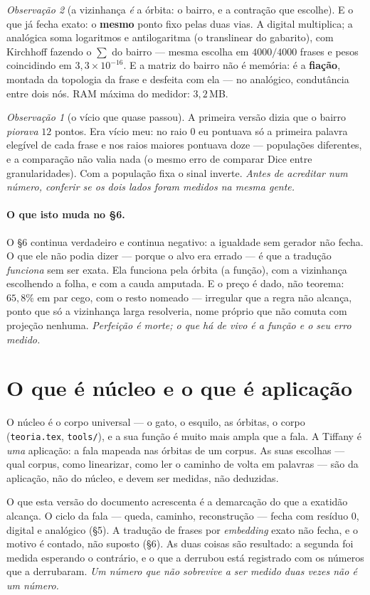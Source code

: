 \documentclass[11pt,a4paper]{article}
\theoremstyle{remark}
\newtheorem{obs}{Observação}
\begin{document}
\begin{obs}[a vizinhança \emph{é} a órbita: o bairro, e a contração que escolhe]
E o que já fecha exato: o \textbf{mesmo} ponto fixo pelas duas vias. A digital multiplica; a analógica
soma logaritmos e antilogaritma (o translinear do gabarito), com Kirchhoff fazendo o $\sum$ do bairro
--- mesma escolha em $4000/4000$ frases e pesos coincidindo em $3{,}3\times10^{-16}$. E a matriz do
bairro não é memória: é a \textbf{fiação}, montada da topologia da frase e desfeita com ela --- no
analógico, condutância entre dois nós. RAM máxima do medidor: $3{,}2\,$MB.

\begin{obs}[o vício que quase passou]
A primeira versão dizia que o bairro \emph{piorava} $12$ pontos. Era vício meu: no raio $0$ eu pontuava
só a primeira palavra elegível de cada frase e nos raios maiores pontuava doze --- populações
diferentes, e a comparação não valia nada (o mesmo erro de comparar Dice entre granularidades). Com a
população fixa o sinal inverte. \emph{Antes de acreditar num número, conferir se os dois lados foram
medidos na mesma gente.}
\end{obs}
\end{obs}

\paragraph{O que isto muda no §6.} O §6 continua verdadeiro e continua negativo: a igualdade sem gerador
não fecha. O que ele não podia dizer --- porque o alvo era errado --- é que a tradução \emph{funciona}
sem ser exata. Ela funciona pela órbita (a função), com a vizinhança escolhendo a folha, e com a cauda
amputada. E o preço é dado, não teorema: $65{,}8\%$ em par cego, com o resto nomeado --- irregular que a
regra não alcança, ponto que só a vizinhança larga resolveria, nome próprio que não comuta com projeção
nenhuma. \emph{Perfeição é morte; o que há de vivo é a função e o seu erro medido.}

\section{O que é núcleo e o que é aplicação}

O núcleo é o corpo universal --- o gato, o esquilo, as órbitas, o corpo (\texttt{teoria.tex},
\texttt{tools/}), e a sua função é muito mais ampla que a fala. A Tiffany é \emph{uma} aplicação: a
fala mapeada nas órbitas de um corpus. As suas escolhas --- qual corpus, como linearizar, como ler o
caminho de volta em palavras --- são da aplicação, não do núcleo, e devem ser medidas, não deduzidas.

O que esta versão do documento acrescenta é a demarcação do que a exatidão alcança. O ciclo da fala
--- queda, caminho, reconstrução --- fecha com resíduo $0$, digital e analógico (§5). A tradução de
frases por \emph{embedding} exato não fecha, e o motivo é contado, não suposto (§6). As duas coisas são
resultado: a segunda foi medida esperando o contrário, e o que a derrubou está registrado com os
números que a derrubaram. \emph{Um número que não sobrevive a ser medido duas vezes não é um número.}
\end{document}
